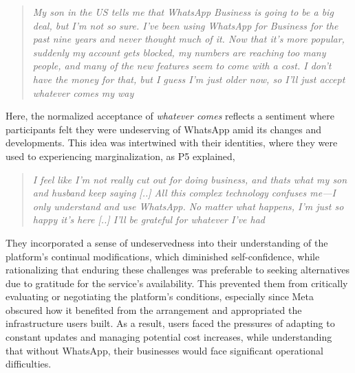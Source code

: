 \begin{quote}
    \textit{My son in the US tells me that WhatsApp Business is going to be a big deal, but I’m not so sure. I’ve been using WhatsApp for Business for the past nine years and never thought much of it. Now that it’s more popular, suddenly my account gets blocked, my numbers are reaching too many people, and many of the new features seem to come with a cost. I don’t have the money for that, but I guess I’m just older now, so I’ll just accept whatever comes my way}
\end{quote}

Here, the normalized acceptance of \textit{whatever comes} reflects a sentiment where participants felt they were undeserving of WhatsApp amid its changes and developments. This idea was intertwined with their identities, where they were used to experiencing marginalization, as P5 explained, 

\begin{quote}
    \textit{I feel like I’m not really cut out for doing business, and thats what my son and husband keep saying [..] All this complex technology confuses me—I only understand and use WhatsApp. No matter what happens, I’m just so happy it’s here [..] I’ll be grateful for whatever I’ve had}
\end{quote}

They incorporated a sense of undeservedness into their understanding of the platform's continual modifications, which diminished self-confidence, while rationalizing that enduring these challenges was preferable to seeking alternatives due to gratitude for the service's availability. This prevented them from critically evaluating or negotiating the platform's conditions, especially since Meta obscured how it benefited from the arrangement and appropriated the infrastructure users built. As a result, users faced the pressures of adapting to constant updates and managing potential cost increases, while understanding that without WhatsApp, their businesses would face significant operational difficulties. 














